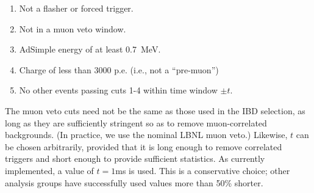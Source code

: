 \documentclass[../thesis.tex]{subfiles}
\begin{document}

\begin{enumerate}
\item Not a flasher or forced trigger.
\item Not in a muon veto window.
\item AdSimple energy of at least 0.7~MeV.
\item Charge of less than 3000 p.e. (i.e., not a ``pre-muon'')
\item No other events passing cuts 1-4 within time window $\pm t$.
\end{enumerate}

The muon veto cuts need not be the same as those used in the IBD selection, as long as they are sufficiently stringent so as to remove muon-correlated backgrounds. (In practice, we use the nominal LBNL muon veto.) Likewise, $t$ can be chosen arbitrarily, provided that it is long enough to remove correlated triggers and short enough to provide sufficient statistics. As currently implemented, a value of $t = 1$ms is used. This is a conservative choice; other analysis groups have successfully used values more than 50\% shorter.

\def\Rplu{\ensuremath{R_\mathrm{+}}}
\def\Rpro{\ensuremath{R_\mathrm{p}}}
\def\Rdel{\ensuremath{R_\mathrm{d}}}
\def\Rsub{\ensuremath{R_\mathrm{\lambda}}}
\def\Nplu{\ensuremath{N_\mathrm{+}}}
\def\Npro{\ensuremath{N_\mathrm{p}}}
\def\Ndel{\ensuremath{N_\mathrm{d}}}
\def\eisol{\ensuremath{\epsilon_\mathrm{i}}}
\def\emu{\ensuremath{\epsilon_\mathrm{\mu}}}
\end{document}
